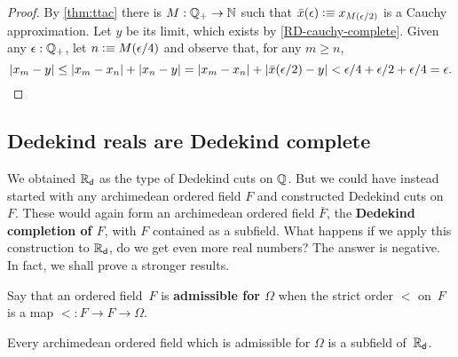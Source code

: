 \begin{proof}
  By \autoref{thm:ttac} there is $M : \mathbb{Q}_{+} \to \mathbb{N}$ such that $\bar{x}(\epsilon) \vcentcolon\equiv
  x_{M(\epsilon/2)}$ is a Cauchy approximation. Let $y$ be its limit, which exists by
  \autoref{RD-cauchy-complete}. Given any $\epsilon : \mathbb{Q}_{+}$, let $n \vcentcolon\equiv M(\epsilon/4)$
  and observe that, for any $m \geq n$,
  \begin{equation*}
    |x_m - y| \leq |x_m - x_n| + |x_n - y| =
    |x_m - x_n| + |\bar{x}(\epsilon/2) - y| <
    \epsilon/4 + \epsilon/2 + \epsilon/4 = \epsilon.\qedhere
  \end{equation*}
\end{proof}

\subsection{Dedekind reals are Dedekind complete}
\label{sec:RD-dedekind-complete}

We obtained $\mathbb{R}_\mathsf{d}$ as the type of Dedekind cuts on $\mathbb{Q}$. But we could have instead started
with any archimedean ordered field $F$ and constructed Dedekind cuts on $F$. These would
again form an archimedean ordered field $\bar{F}$, the \textbf{Dedekind completion of
  $F$}, with $F$ contained as a subfield. What happens if we apply this construction to
$\mathbb{R}_\mathsf{d}$, do we get even more real numbers? The answer is negative. In fact, we shall prove a
stronger results.

Say that an ordered field~$F$ is \textbf{admissible for $\Omega$} when the strict order
$<$ on~$F$ is a map ${<} : F \to F \to \Omega$.

\begin{thm} \label{RD-final-field}
  Every archimedean ordered field which is admissible for $\Omega$ is a subfield of~$\mathbb{R}_\mathsf{d}$.
\end{thm}

